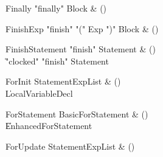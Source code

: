 \begin{bbgrammar}

Finally \label{prod:Finally}  \: \xcd"finally" Block & () \\


\end{bbgrammar}

\begin{bbgrammar}

FinishExp \label{prod:FinishExp}  \: \xcd"finish" \xcd"(" Exp \xcd")" Block & () \\


\end{bbgrammar}

\begin{bbgrammar}

FinishStatement \label{prod:FinishStatement}  \: \xcd"finish" Statement & () \\

    \| \xcd"clocked" \xcd"finish" Statement \\

\end{bbgrammar}

\begin{bbgrammar}

ForInit \label{prod:ForInit}  \: StatementExpList & () \\

    \| LocalVariableDecl \\

\end{bbgrammar}

\begin{bbgrammar}

ForStatement \label{prod:ForStatement}  \: BasicForStatement & () \\

    \| EnhancedForStatement \\

\end{bbgrammar}

\begin{bbgrammar}

ForUpdate \label{prod:ForUpdate}  \: StatementExpList & () \\


\end{bbgrammar}

